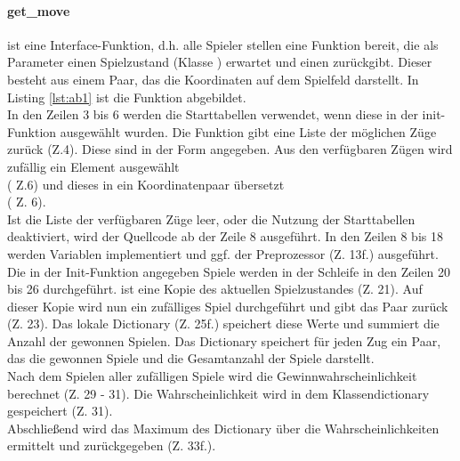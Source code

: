 \paragraph{get\_move}
  ist eine Interface-Funktion, d.h. alle Spieler stellen eine Funktion  bereit, die als Parameter einen Spielzustand (Klasse ) erwartet und einen  zurückgibt. Dieser besteht aus einem Paar, das die Koordinaten auf dem Spielfeld darstellt. In Listing \ref{lst:ab1} ist die Funktion abgebildet.
\vspace{0.5cm}
\\In den Zeilen 3 bis 6 werden die Starttabellen verwendet, wenn diese in der init-Funktion ausgewählt wurden. Die Funktion  gibt eine Liste der möglichen Züge zurück (Z.4). Diese sind in der Form  angegeben. Aus den verfügbaren Zügen wird zufällig ein Element ausgewählt \\( Z.6) und dieses in ein Koordinatenpaar übersetzt \\( Z. 6). 
\\Ist die Liste der verfügbaren Züge leer, oder die Nutzung der Starttabellen deaktiviert, wird der Quellcode ab der Zeile 8 ausgeführt. In den Zeilen 8 bis 18 werden Variablen implementiert und ggf. der Preprozessor (Z. 13f.) ausgeführt.
\\Die in der Init-Funktion angegeben  Spiele werden in der Schleife in den Zeilen 20 bis 26 durchgeführt.
 ist eine Kopie des aktuellen Spielzustandes (Z. 21). Auf dieser Kopie wird nun ein zufälliges Spiel durchgeführt und gibt das Paar  zurück (Z. 23). Das lokale Dictionary  (Z. 25f.) speichert diese Werte und summiert die Anzahl der gewonnen Spielen.
Das Dictionary speichert für jeden Zug ein Paar, das die gewonnen Spiele und die Gesamtanzahl der Spiele darstellt.
\\ Nach dem Spielen aller zufälligen Spiele wird die Gewinnwahrscheinlichkeit berechnet (Z. 29 - 31). Die Wahrscheinlichkeit wird in dem Klassendictionary  gespeichert (Z. 31).
\\Abschließend wird das Maximum des Dictionary über die Wahrscheinlichkeiten ermittelt und zurückgegeben (Z. 33f.).


